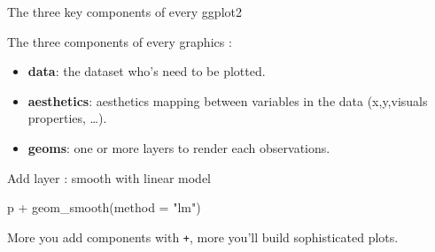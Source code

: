 \documentclass[14pt,ignorenonframetext,]{bredelebeamer}
\newenvironment{Shaded}{\begin{snugshade}}{\end{snugshade}}
\newcommand{\KeywordTok}[1]{\textcolor[rgb]{0.94,0.87,0.69}{#1}}
\newcommand{\DataTypeTok}[1]{\textcolor[rgb]{0.87,0.87,0.75}{#1}}
\newcommand{\StringTok}[1]{\textcolor[rgb]{0.80,0.58,0.58}{#1}}
\newcommand{\CommentTok}[1]{\textcolor[rgb]{0.50,0.62,0.50}{#1}}
\newcommand{\OperatorTok}[1]{\textcolor[rgb]{0.94,0.94,0.82}{#1}}
\newcommand{\NormalTok}[1]{\textcolor[rgb]{0.80,0.80,0.80}{#1}}
\providecommand{\tightlist}{%
  \setlength{\itemsep}{0pt}\setlength{\parskip}{0pt}}
\begin{document}
\begin{frame}[fragile]{The three key components of every ggplot2}

\Large

The three components of every graphics :

\begin{itemize}
\tightlist
\item
  \textbf{data}: the dataset who's need to be plotted.
\item
  \textbf{aesthetics}: aesthetics mapping between variables in the data
  (x,y,visuals properties, \ldots{}).
\item
  \textbf{geoms}: one or more layers to render each observations.
\end{itemize}

\begin{Shaded}
\end{Shaded}

Add layer : smooth with linear model

\begin{Shaded}
\begin{Highlighting}[]
\NormalTok{p }\OperatorTok{+}\StringTok{ }\KeywordTok{geom_smooth}\NormalTok{(}\DataTypeTok{method =} \StringTok{"lm"}\NormalTok{)}
\end{Highlighting}
\end{Shaded}

More you add components with \texttt{+}, more you'll build sophisticated
plots.

\end{frame}
\end{document}
